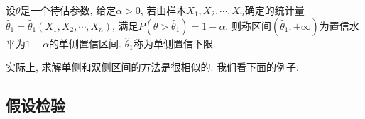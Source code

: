 \begin{definition}
    设$\theta$是一个待估参数, 给定$\alpha>0$, 若由样本$X_1, X_2, \cdots, X_n$确定的统计量$\hat\theta_1=\hat\theta_1(X_1, X_2, \cdots, X_n)$, 满足$P(\theta>\hat\theta_1)=1-\alpha.$ 则称区间$(\hat\theta_1,+\infty)$为置信水平为$1-\alpha$的单侧置信区间. $\hat\theta_1$称为单侧置信下限. 
\end{definition}

实际上, 求解单侧和双侧区间的方法是很相似的. 我们看下面的例子. 

\subsection{假设检验} 

